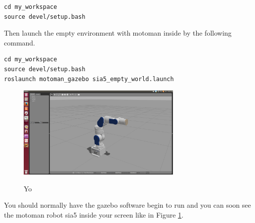 \begin{lstlisting}
cd my_workspace
source devel/setup.bash
\end{lstlisting}

Then launch the empty environment with motoman inside by the following command.

\begin{lstlisting}
cd my_workspace
source devel/setup.bash
roslaunch motoman_gazebo sia5_empty_world.launch
\end{lstlisting}
\begin{figure}
\includegraphics[width=8cm]{images/utilisation/launch_gazebo.png}
\centering
\label{fig:launch_gazebo}
\caption{Yo}
\end{figure}
You should normally have the gazebo software begin to run and you can soon see the motoman robot sia5 inside your screen like in Figure \ref{fig:launch_gazebo}.
